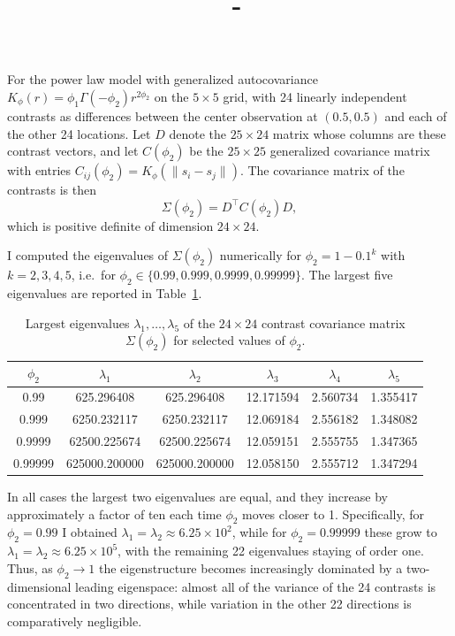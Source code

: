 \documentclass[answers,12pt,addpoints]{exam}
\author{\name}
\title{\course \ - \assignment}
\begin{document}
\maketitle

\begin{questions}


\begin{solution}
For the power law model with generalized autocovariance
$K_\phi(r) = \phi_1 \Gamma(-\phi_2) r^{2\phi_2}$ on the $5\times 5$
grid, with 24 linearly independent contrasts as differences
between the center observation at $(0.5,0.5)$ and each of the other
24 locations.  Let $D$ denote the $25\times 24$ matrix whose columns
are these contrast vectors, and let $C(\phi_2)$ be the $25\times 25$
generalized covariance matrix with entries
$C_{ij}(\phi_2) = K_\phi(\lVert s_i-s_j\rVert)$.  The covariance matrix
of the contrasts is then
\[
\Sigma(\phi_2) = D^\top C(\phi_2) D,
\]
which is positive definite of dimension $24\times 24$.

I computed the eigenvalues of $\Sigma(\phi_2)$ numerically for
$\phi_2 = 1 - 0.1^k$ with $k=2,3,4,5$, i.e.\ for
$\phi_2 \in \{0.99, 0.999, 0.9999, 0.99999\}$.  The largest five
eigenvalues are reported in Table~\ref{tab:eigs_top5}.
\end{solution}

\begin{table}[ht]
\centering
\begin{tabular}{cccccc}
\hline
$\phi_2$ & $\lambda_{1}$ & $\lambda_{2}$ & $\lambda_{3}$ & $\lambda_{4}$ & $\lambda_{5}$ \\
\hline
0.99    & 625.296408   & 625.296408   & 12.171594 & 2.560734 & 1.355417 \\
0.999   & 6250.232117  & 6250.232117  & 12.069184 & 2.556182 & 1.348082 \\
0.9999  & 62500.225674 & 62500.225674 & 12.059151 & 2.555755 & 1.347365 \\
0.99999 & 625000.200000& 625000.200000& 12.058150 & 2.555712 & 1.347294 \\
\hline
\end{tabular}
\caption{Largest eigenvalues $\lambda_1,\dots,\lambda_5$ of the
$24\times24$ contrast covariance matrix $\Sigma(\phi_2)$ for selected
values of $\phi_2$.}
\label{tab:eigs_top5}
\end{table}

\begin{solution}
In all cases the largest two eigenvalues are equal, and they increase
by approximately a factor of ten each time $\phi_2$ moves closer to 1.
Specifically, for $\phi_2 = 0.99$ I obtained
$\lambda_1 = \lambda_2 \approx 6.25\times 10^2$, while for
$\phi_2 = 0.99999$ these grow to
$\lambda_1 = \lambda_2 \approx 6.25\times 10^5$, with the remaining
22 eigenvalues staying of order one.  Thus, as $\phi_2 \to 1$ the
eigenstructure becomes increasingly dominated by a two-dimensional
leading eigenspace: almost all of the variance of the 24 contrasts is
concentrated in two directions, while variation in the other 22
directions is comparatively negligible.


\end{solution}
\end{questions}
\end{document}
